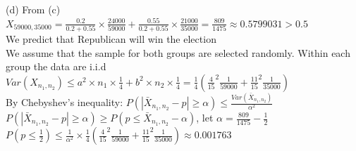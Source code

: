 \documentclass[11pt]{article}
\begin{document}
(d) From (c) $X_{59000,35000} = \frac{0.2}{0.2+0.55} \times \frac{24000}{59000} + \frac{0.55}{0.2+0.55} \times \frac{21000}{35000} =\frac{809}{1475} \approx 0.5799031 > 0.5$\\
We predict that Republican will win the election\\
We assume that  the sample for both groups are selected randomly. Within each group the data are i.i.d\\%
$Var(X_{n_1,n_2})  \leq a^2\times n_1\times \frac{1}{4} + b^2 \times n_2 \times \frac{1}{4} = \frac{1}{4}(\frac{4}{15}^2 \frac{1}{59000} + \frac{11}{15}^2 \frac{1}{35000})$\\
By Chebyshev's inequality: $P(|\bar{X}_{n_1,n_2}- p| \geq \alpha) \leq \frac{Var(\bar{X}_{n_1,n_2})}{\alpha^2} $\\
$P(|\bar{X}_{n_1,n_2}- p| \geq \alpha) \geq P(p \leq \bar{X}_{n_1,n_2} - \alpha  )$, let $\alpha = \frac{809}{1475} - \frac{1}{2} $\\
$P(p \leq \frac{1}{2}  ) \leq \frac{1}{\alpha^2} \times \frac{1}{4}(\frac{4}{15}^2 \frac{1}{59000} + \frac{11}{15}^2 \frac{1}{35000}) \approx 0.001763$

 


 
\end{document}
